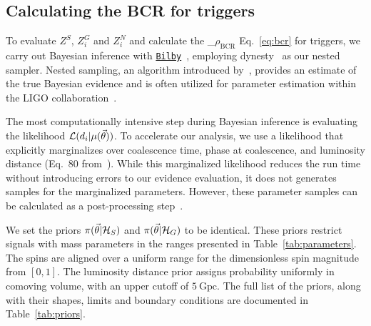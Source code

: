 \documentclass[%
 nofootinbib,
 amsmath,amssymb,
 aps,
 twocolumn,
 superscriptaddress
]{revtex4-2}
\newcommand{\bilby}{{\sc \href{https://lscsoft.docs.ligo.org/bilby/}{\texttt{Bilby}}}\xspace}
\newcommand{\dynesty}{{\sc dynesty}\xspace}
\newcommand{\mathcmd}[1]{{\sc \relax\ifmmode#1\else $#1$\fi}\xspace}
\newcommand{\bcr}{\mathcmd{\rho_\text{BCR}}}
\newcommand{\parameters}{\mathcmd{\vec{\theta}}}
\newcommand{\template}{\mathcmd{\mu(\parameters)}}
\begin{document}
\subsection{Calculating the BCR for triggers}
To evaluate $Z^S$, $Z^G_i$ and $Z^N_i$ and calculate the \bcr Eq.~\ref{eq:bcr} for triggers, we carry out Bayesian inference with \bilby~\cite{bilby, bilby_pipe}, employing \dynesty~\cite{dynesty} as our nested sampler. Nested sampling, an algorithm introduced by~\citet{skilling2004, skilling2006}, provides an estimate of the true Bayesian evidence and is often utilized for parameter estimation within the LIGO collaboration~\cite{bilby, bilby_paper, pbilby_paper}.

The most computationally intensive step during Bayesian inference is evaluating the likelihood $\mathcal{L}(d_i|\template)$. To accelerate our analysis, we use a likelihood that explicitly marginalizes over coalescence time, phase at coalescence, and luminosity distance (Eq.~80 from~\citet{intro_to_gw_bayes}). While this marginalized likelihood reduces the run time without introducing errors to our evidence evaluation, it does not generates samples for the marginalized parameters. However, these parameter samples can be calculated as a post-processing step~\cite{intro_to_gw_bayes}.

We set the priors $\pi(\parameters|\mathcal{H}_S)$ and $\pi(\parameters|\mathcal{H}_G)$ to be identical. These priors restrict signals with mass parameters in the ranges presented in Table~\ref{tab:parameters}. The spins are aligned over a uniform range for the dimensionless spin magnitude from $\left[0,1\right]$. The luminosity distance prior assigns probability uniformly in comoving volume, with an upper cutoff of $5\ \text{Gpc}$. The full list of the priors, along with their shapes, limits and boundary conditions are documented in Table~\ref{tab:priors}. 
\end{document}
